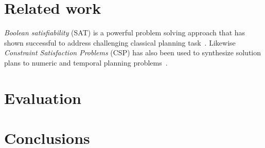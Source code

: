 \documentclass[letterpaper]{article} %
\begin{document}
\section{Related work}
\label{sec:related}
{\em Boolean satisfiability} (SAT) is a powerful problem solving approach that has shown successful to address challenging classical planning task~\cite{kautz1999unifying,rintanen2009planning,rintanen2012planning}. Likewise {\em Constraint Satisfaction Problems} (CSP) has also been used to synthesize solution plans to numeric and temporal planning problems~\cite{do2001planning,lopez2003generalizing,vidal2006branching,garrido2009constraint}. 


\section{Evaluation}
\label{sec:evaluation}

\section{Conclusions}
\label{sec:conclusions}





\end{document}
